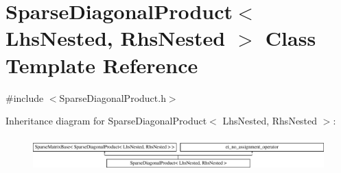 \hypertarget{class_sparse_diagonal_product}{\section{Sparse\-Diagonal\-Product$<$ Lhs\-Nested, Rhs\-Nested $>$ Class Template Reference}
\label{class_sparse_diagonal_product}
}


{\ttfamily \#include $<$Sparse\-Diagonal\-Product.\-h$>$}

Inheritance diagram for Sparse\-Diagonal\-Product$<$ Lhs\-Nested, Rhs\-Nested $>$\-:\begin{figure}[H]
\begin{center}
\leavevmode
\includegraphics[height=1.293303cm]{class_sparse_diagonal_product}
\end{center}
\end{figure}
